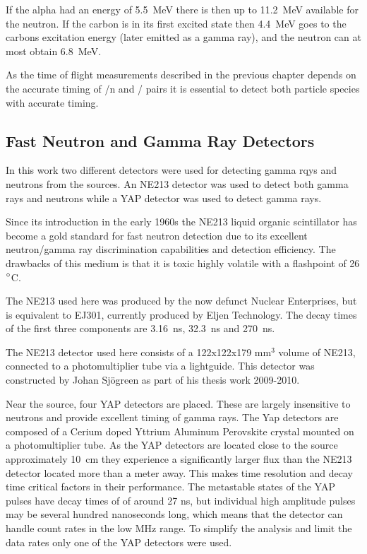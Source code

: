 \documentclass[main.tex]{subfiles}
\begin{document}
If the alpha had an energy of \SI{5.5}{\MeV} there is then up to \SI{11.2}{\MeV} available for the neutron. If the carbon is in its first excited state then \SI{4.4}{\MeV} goes to the carbons excitation energy (later emitted as a gamma ray), and the neutron can at most obtain \SI{6.8}{\MeV}. 

As the time of flight measurements described in the previous chapter depends on the accurate timing of \textgamma /n and \textgamma /\textgamma\; pairs it is essential to detect both particle species with accurate timing.

\subsection{Fast Neutron and Gamma Ray Detectors}
In this work two different detectors were used for detecting gamma rqys and neutrons from the sources. An NE213 detector was used to detect both gamma rays and neutrons while a YAP detector was used to detect gamma rays. 

Since its introduction in the early 1960s the NE213 liquid organic scintillator has become a gold standard for fast neutron detection due to its excellent neutron/gamma ray discrimination capabilities and detection efficiency. The drawbacks of this medium is that it is toxic highly volatile with a flashpoint of 26$\text{\degree}$C. 

The NE213 used here was produced by the now defunct Nuclear Enterprises, but is equivalent to EJ301, currently produced by Eljen Technology. The decay times of the first three components are \SI{3.16}{ns}, \SI{32.3}{ns} and \SI{270}{ns}\cite{Eljen}.

The NE213 detector used here consists of a 122x122x179 \si{\mm}$^\text{3}$ volume of NE213, connected to a photomultiplier tube via a lightguide. This detector was constructed by Johan Sjögreen as part of his thesis work 2009-2010\cite{sjogren}.

Near the source, four YAP detectors are placed. These are largely insensitive to neutrons and provide excellent timing of gamma rays. The Yap detectors are composed of a Cerium doped Yttrium Aluminum Perovskite crystal mounted on a photomultiplier tube. As the YAP detectors are located close to the source approximately \si{10\cm} they experience a significantly larger flux than the NE213 detector located more than a meter away. This makes time resolution and decay time critical factors in their performance. The metastable states of the YAP pulses have decay times of of around 27 ns, but individual high amplitude pulses may be several hundred nanoseconds long, which means that the detector can handle count rates in the low MHz range. To simplify the analysis and limit the data rates only one of the YAP detectors were used.
\end{document}
